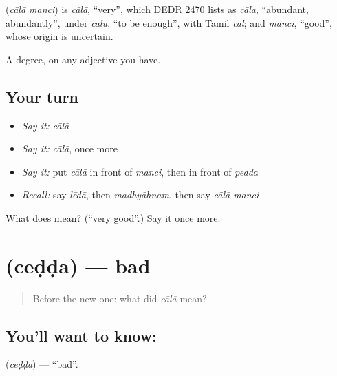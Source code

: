 \begin{cousinweb}
\textbf{ } (\emph{cālā manci}) is \emph{cālā}, \textquotedblleft{}very\textquotedblright{}, which DEDR 2470 lists as \emph{cāla}, \textquotedblleft{}abundant, abundantly\textquotedblright{}, under \emph{cālu}, \textquotedblleft{}to be enough\textquotedblright{}, with Tamil \emph{cāl}; and \emph{manci}, \textquotedblleft{}good\textquotedblright{}, whose origin is uncertain.
\end{cousinweb}

\begin{grammarlens}[title={What you've built}]
A degree, on any adjective you have.
\end{grammarlens}

\subsection*{Your turn}
\begin{itemize}
\raggedright
  \item \emph{Say it:} \emph{cālā}
  \item \emph{Say it:} \emph{cālā}, once more
  \item \emph{Say it:} put \emph{cālā} in front of \emph{manci}, then in front of \emph{pedda}
  \item \emph{Recall:} say \emph{lēdā}, then \emph{madhyāhnam}, then say \emph{cālā manci}
\end{itemize}

\begin{tcolorbox}[breakable,colback=teal!4,colframe=teal!35!black,title={Before you move on}]
What does   mean? (\textquotedblleft{}very good\textquotedblright{}.) Say it once more.
\end{tcolorbox}
\section[\texorpdfstring{\te{చెడ్డ} (ceḍḍa)}{చెడ్డ (ceḍḍa)}]{ (ceḍḍa) — bad}

\label{lesson:TE-C76-bad}



\begin{quote}
Before the new one: what did \emph{cālā} mean?
\end{quote}

\subsection*{You'll want to know: }
\textbf{} (\emph{ceḍḍa}) — \textquotedblleft{}bad\textquotedblright{}.

